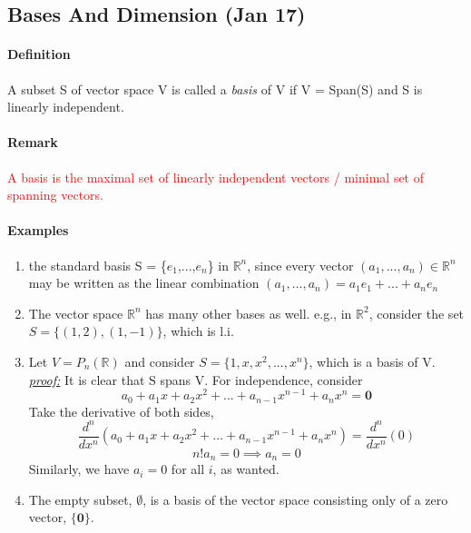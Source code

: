 \documentclass[11pt]{article}
\newcommand{\ti}[1]{\textit{#1}}
\newcommand{\tb}[1]{\textbf{#1}}
\newcommand{\mb}[1]{\mathbb{#1}}
\newcommand{\proof}[0]{\textit{\underline{proof:} }}
\begin{document}
	\subsection{Bases And Dimension (Jan 17)}
	\paragraph{Definition} A subset S of vector space V is called a \ti{basis} of V if V = Span(S) and S is linearly independent.
	\paragraph{Remark}
	\textcolor{red}{A basis is the maximal set of linearly independent vectors / minimal set of spanning vectors.}
	\paragraph{Examples} 
	\begin{enumerate}
		\item the standard basis S = \{\tb{$e_1$},...,\tb{$e_n$}\} in $\mb{R}^n$, since every vector $(a_1, ..., a_n) \in \mb{R}^n$ may be written as the linear combination $(a_1,..., a_n) = a_1e_1+ ... + a_ne_n$
		\item The vector space $\mb{R}^n$ has many other bases as well. e.g., in $\mb{R}^2$, consider the set $S = \{(1,2),(1,-1)\}$, which is l.i.
		\item Let $V = P_n(\mb{R})$ and consider $ S = \{1, x, x^2, ..., x^n\}$, which is a basis of V.
		\newline
		\proof It is clear that S spans V. For independence, consider
		$$a_0 + a_1x+a_2x^2+...+a_{n-1}x^{n-1}+a_nx^n = \tb{0}$$
		Take the derivative of both sides,
		$$\frac{d^n}{dx^n}(a_0 + a_1x+a_2x^2+...+a_{n-1}x^{n-1}+a_nx^n) = \frac{d^n}{dx^n}(0)$$
		$$n!a_n = 0 \implies a_n = 0$$
		Similarly, we have $a_i = 0$ for all $i$, as wanted.
		
		\item The empty subset, $\emptyset$, is a basis of the vector space consisting only of a zero vector, $\{\tb{0}\}$.
	\end{enumerate}
\end{document}
